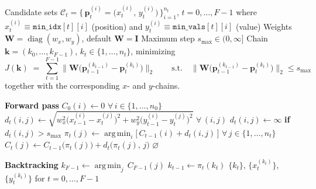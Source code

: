 \clearpage
\begin{algorithm}[H]
\caption{Dynamic program for the optimal 2D chain of candidate points, Viterbi Algorithm}
\label{alg:best_chain_2d}
\begin{algorithmic}[1]
 
\Require Candidate sets $\mathcal{C}_t = \big\{\, \mathbf{p}_t^{(i)} = \big(x_t^{(i)},\, y_t^{(i)}\big) \,\big\}_{i=1}^{n_t}$,\; $t = 0,\dots,F-1$
    \Statex \hspace{\algorithmicindent} where $x_t^{(i)} \equiv \texttt{min\_idx}[t][i]$ (position) and $y_t^{(i)} \equiv \texttt{min\_vals}[t][i]$ (value)
\Require Weights $\mathbf{W} = \operatorname{diag}(w_x, w_y)$, default $\mathbf{W} = \mathbf{I}$
\Require Maximum step $s_{\max} \in (0, \infty]$ 
\Ensure  Chain $\mathbf{k} = (k_0,\dots,k_{F-1})$, $k_t \in \{1,\dots,n_t\}$, minimizing
    \[
        J(\mathbf{k}) \;=\; \sum_{t=1}^{F-1}
        \big\| \mathbf{W}\big( \mathbf{p}_{t-1}^{(k_{t-1})} - \mathbf{p}_{t}^{(k_{t})} \big) \big\|_2
        \qquad \text{s.t.}\quad
        \big\| \mathbf{W}\big( \mathbf{p}_{t-1}^{(k_{t-1})} - \mathbf{p}_{t}^{(k_{t})} \big) \big\|_2 \le s_{\max}
    \]
    together with the corresponding $x$- and $y$-chains.
\Statex
 
\Statex \textbf{Forward pass} 
\State $C_0(i) \gets 0$ \quad $\forall\, i \in \{1,\dots,n_0\}$
    \State {}
    \State $d_t(i,j) \gets
        \sqrt{ w_x^2 \big( x_{t-1}^{(i)} - x_t^{(j)} \big)^2
             + w_y^2 \big( y_{t-1}^{(i)} - y_t^{(j)} \big)^2 }$
        \quad $\forall\, (i,j)$
    \State $d_t(i,j) \gets \infty$ \; \textbf{if} \; $d_t(i,j) > s_{\max}$ 
    \Statex
    \State {}
    \State $\pi_t(j) \gets \displaystyle\operatorname*{arg\,min}_{i} \big[\, C_{t-1}(i) + d_t(i,j) \,\big]$
        \quad $\forall\, j \in \{1,\dots,n_t\}$
    \State $C_t(j) \gets C_{t-1}\big(\pi_t(j)\big) + d_t\big(\pi_t(j),\, j\big)$
    \Statex
        \State \Return $\varnothing$ 
    \EndIf
\EndFor
\Statex
 
\Statex \textbf{Backtracking}
\State $k_{F-1} \gets \displaystyle\operatorname*{arg\,min}_{j} \, C_{F-1}(j)$ 
    \State $k_{t-1} \gets \pi_t(k_t)$
\EndFor
\Statex
\State \Return $\big\{ k_t \big\}$, \; $\big\{ x_t^{(k_t)} \big\}$, \; $\big\{ y_t^{(k_t)} \big\}$ \quad for $t = 0,\dots,F-1$
\end{algorithmic}
\end{algorithm}

